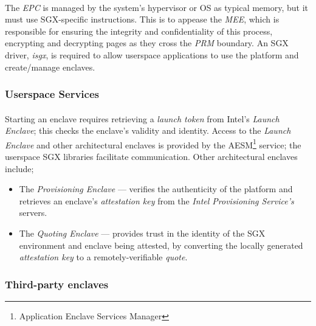 \paragraph{} The \textit{EPC} is managed by the system's hypervisor or OS as typical memory, but it must use SGX-specific instructions. This is to appease the \textit{MEE}, which is responsible for ensuring the integrity and confidentiality of this process, encrypting and decrypting pages as they cross the \textit{PRM} boundary. An SGX driver, \textit{isgx}, is required to allow userspace applications to use the platform and create/manage enclaves.


\subsubsection{Userspace Services}
\paragraph{} Starting an enclave requires retrieving a \textit{launch token} from Intel's \textit{Launch Enclave}; this checks the enclave's validity and identity. Access to the \textit{Launch Enclave} and other architectural enclaves is provided by the AESM\footnote{Application Enclave Services Manager} service; the userspace SGX libraries facilitate communication. Other architectural enclaves include;

\begin{itemize}
    \item The \textit{Provisioning Enclave} --- verifies the authenticity of the platform and retrieves an enclave's \textit{attestation key} from the \textit{Intel Provisioning Service's} servers.
    \item The \textit{Quoting Enclave} --- provides trust in the identity of the SGX environment and enclave being attested, by converting the locally generated \textit{attestation key} to a remotely-verifiable \textit{quote}.
\end{itemize}

\subsubsection{Third-party enclaves}
